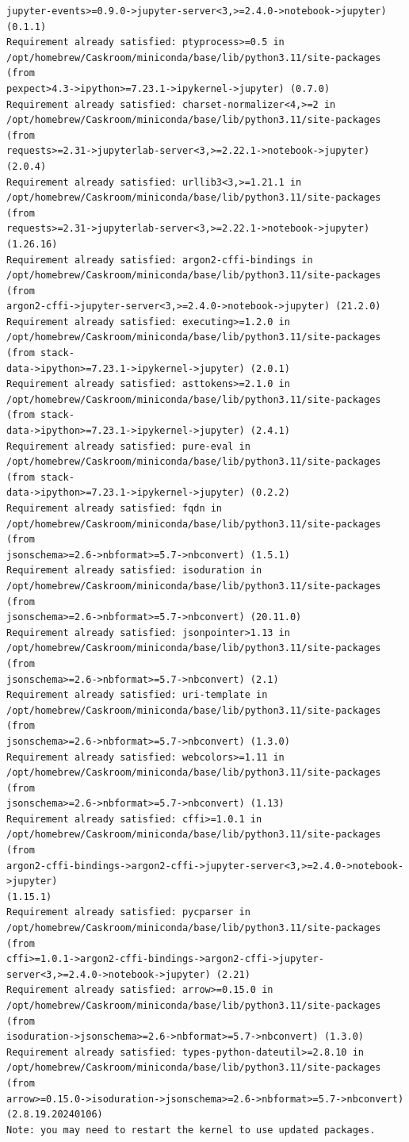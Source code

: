 \documentclass[11pt]{article}
\begin{document}
\begin{Verbatim}[commandchars=\\\{\}]
jupyter-events>=0.9.0->jupyter-server<3,>=2.4.0->notebook->jupyter) (0.1.1)
Requirement already satisfied: ptyprocess>=0.5 in
/opt/homebrew/Caskroom/miniconda/base/lib/python3.11/site-packages (from
pexpect>4.3->ipython>=7.23.1->ipykernel->jupyter) (0.7.0)
Requirement already satisfied: charset-normalizer<4,>=2 in
/opt/homebrew/Caskroom/miniconda/base/lib/python3.11/site-packages (from
requests>=2.31->jupyterlab-server<3,>=2.22.1->notebook->jupyter) (2.0.4)
Requirement already satisfied: urllib3<3,>=1.21.1 in
/opt/homebrew/Caskroom/miniconda/base/lib/python3.11/site-packages (from
requests>=2.31->jupyterlab-server<3,>=2.22.1->notebook->jupyter) (1.26.16)
Requirement already satisfied: argon2-cffi-bindings in
/opt/homebrew/Caskroom/miniconda/base/lib/python3.11/site-packages (from
argon2-cffi->jupyter-server<3,>=2.4.0->notebook->jupyter) (21.2.0)
Requirement already satisfied: executing>=1.2.0 in
/opt/homebrew/Caskroom/miniconda/base/lib/python3.11/site-packages (from stack-
data->ipython>=7.23.1->ipykernel->jupyter) (2.0.1)
Requirement already satisfied: asttokens>=2.1.0 in
/opt/homebrew/Caskroom/miniconda/base/lib/python3.11/site-packages (from stack-
data->ipython>=7.23.1->ipykernel->jupyter) (2.4.1)
Requirement already satisfied: pure-eval in
/opt/homebrew/Caskroom/miniconda/base/lib/python3.11/site-packages (from stack-
data->ipython>=7.23.1->ipykernel->jupyter) (0.2.2)
Requirement already satisfied: fqdn in
/opt/homebrew/Caskroom/miniconda/base/lib/python3.11/site-packages (from
jsonschema>=2.6->nbformat>=5.7->nbconvert) (1.5.1)
Requirement already satisfied: isoduration in
/opt/homebrew/Caskroom/miniconda/base/lib/python3.11/site-packages (from
jsonschema>=2.6->nbformat>=5.7->nbconvert) (20.11.0)
Requirement already satisfied: jsonpointer>1.13 in
/opt/homebrew/Caskroom/miniconda/base/lib/python3.11/site-packages (from
jsonschema>=2.6->nbformat>=5.7->nbconvert) (2.1)
Requirement already satisfied: uri-template in
/opt/homebrew/Caskroom/miniconda/base/lib/python3.11/site-packages (from
jsonschema>=2.6->nbformat>=5.7->nbconvert) (1.3.0)
Requirement already satisfied: webcolors>=1.11 in
/opt/homebrew/Caskroom/miniconda/base/lib/python3.11/site-packages (from
jsonschema>=2.6->nbformat>=5.7->nbconvert) (1.13)
Requirement already satisfied: cffi>=1.0.1 in
/opt/homebrew/Caskroom/miniconda/base/lib/python3.11/site-packages (from
argon2-cffi-bindings->argon2-cffi->jupyter-server<3,>=2.4.0->notebook->jupyter)
(1.15.1)
Requirement already satisfied: pycparser in
/opt/homebrew/Caskroom/miniconda/base/lib/python3.11/site-packages (from
cffi>=1.0.1->argon2-cffi-bindings->argon2-cffi->jupyter-
server<3,>=2.4.0->notebook->jupyter) (2.21)
Requirement already satisfied: arrow>=0.15.0 in
/opt/homebrew/Caskroom/miniconda/base/lib/python3.11/site-packages (from
isoduration->jsonschema>=2.6->nbformat>=5.7->nbconvert) (1.3.0)
Requirement already satisfied: types-python-dateutil>=2.8.10 in
/opt/homebrew/Caskroom/miniconda/base/lib/python3.11/site-packages (from
arrow>=0.15.0->isoduration->jsonschema>=2.6->nbformat>=5.7->nbconvert)
(2.8.19.20240106)
Note: you may need to restart the kernel to use updated packages.
    \end{Verbatim}
\end{document}
